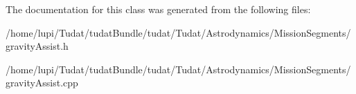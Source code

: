 The documentation for this class was generated from the following files\+:\begin{DoxyCompactItemize}
\item 
/home/lupi/\+Tudat/tudat\+Bundle/tudat/\+Tudat/\+Astrodynamics/\+Mission\+Segments/gravity\+Assist.\+h\item 
/home/lupi/\+Tudat/tudat\+Bundle/tudat/\+Tudat/\+Astrodynamics/\+Mission\+Segments/gravity\+Assist.\+cpp\end{DoxyCompactItemize}
